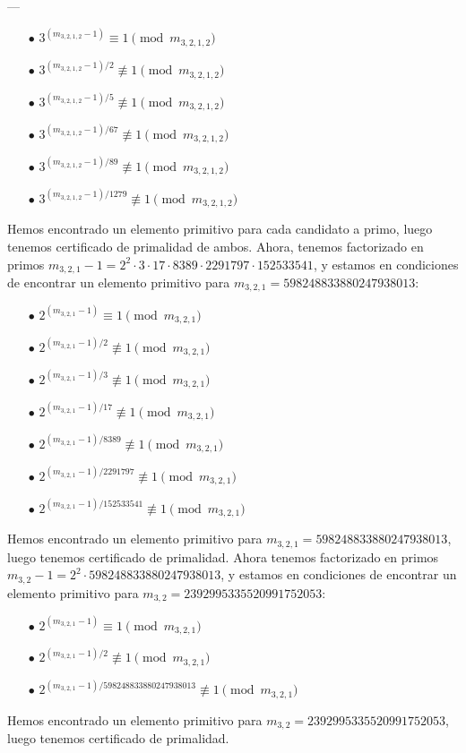 \documentclass[fleqn]{article}
\begin{document}
    ---
    \begin{enumerate}
        \item[$\bullet$] $3^{(m_{3,2,1,2} - 1)} \equiv 1 \pmod{m_{3,2,1,2}}$
        \item[$\bullet$] $3^{(m_{3,2,1,2} - 1)/2} \not\equiv 1 \pmod{m_{3,2,1,2}}$    
        \item[$\bullet$] $3^{(m_{3,2,1,2} - 1)/5} \not\equiv 1 \pmod{m_{3,2,1,2}}$
        \item[$\bullet$] $3^{(m_{3,2,1,2} - 1)/67} \not\equiv 1 \pmod{m_{3,2,1,2}}$
        \item[$\bullet$] $3^{(m_{3,2,1,2} - 1)/89} \not\equiv 1 \pmod{m_{3,2,1,2}}$
        \item[$\bullet$] $3^{(m_{3,2,1,2} - 1)/1279} \not\equiv 1 \pmod{m_{3,2,1,2}}$
    \end{enumerate}
    Hemos encontrado un elemento primitivo para cada candidato a primo, luego tenemos certificado de primalidad de ambos. Ahora, tenemos factorizado en primos 
    $m_{3,2,1} -1 = 2^2 \cdot 3 \cdot 17 \cdot 8389 \cdot 2291797 \cdot 152533541$, y estamos en condiciones de encontrar un elemento primitivo para 
    $m_{3,2,1} = 598248833880247938013$:
    \begin{enumerate}
        \item[$\bullet$] $2^{(m_{3,2,1} - 1)} \equiv 1 \pmod{m_{3,2,1}}$
        \item[$\bullet$] $2^{(m_{3,2,1} - 1)/2} \not\equiv 1 \pmod{m_{3,2,1}}$    
        \item[$\bullet$] $2^{(m_{3,2,1} - 1)/3} \not\equiv 1 \pmod{m_{3,2,1}}$
        \item[$\bullet$] $2^{(m_{3,2,1} - 1)/17} \not\equiv 1 \pmod{m_{3,2,1}}$
        \item[$\bullet$] $2^{(m_{3,2,1} - 1)/8389} \not\equiv 1 \pmod{m_{3,2,1}}$
        \item[$\bullet$] $2^{(m_{3,2,1} - 1)/2291797} \not\equiv 1 \pmod{m_{3,2,1}}$
        \item[$\bullet$] $2^{(m_{3,2,1} - 1)/152533541} \not\equiv 1 \pmod{m_{3,2,1}}$
    \end{enumerate}
    Hemos encontrado un elemento primitivo para $m_{3,2,1} = 598248833880247938013$, luego tenemos certificado de primalidad. Ahora tenemos factorizado en primos
    $m_{3,2} - 1 = 2^2 \cdot 598248833880247938013$, y estamos en condiciones de encontrar un elemento primitivo para $m_{3,2} = 2392995335520991752053$:
    \begin{enumerate}
        \item[$\bullet$] $2^{(m_{3,2,1} - 1)} \equiv 1 \pmod{m_{3,2,1}}$
        \item[$\bullet$] $2^{(m_{3,2,1} - 1)/2} \not\equiv 1 \pmod{m_{3,2,1}}$    
        \item[$\bullet$] $2^{(m_{3,2,1} - 1)/598248833880247938013} \not\equiv 1 \pmod{m_{3,2,1}}$
    \end{enumerate}
    Hemos encontrado un elemento primitivo para $m_{3,2} = 2392995335520991752053$, luego tenemos certificado de primalidad. 
\end{document}
